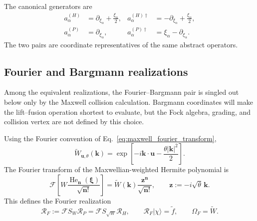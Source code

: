 \documentclass[11pt,oneside]{article}
\numberwithin{equation}{section}
\theoremstyle{definition}
\begin{document}
The canonical generators are
\begin{align}
a^{(H)}_\alpha
&=\partial_{\xi_\alpha}+\frac{\xi_\alpha}{2},
&
a^{(H)\dagger}_\alpha
&=-\partial_{\xi_\alpha}+\frac{\xi_\alpha}{2},
\label{eq:maxwell_ladder_H}
\\
a^{(P)}_\alpha
&=\partial_{\xi_\alpha},
&
a^{(P)\dagger}_\alpha
&=\xi_\alpha-\partial_{\xi_\alpha}.
\label{eq:maxwell_ladder_P}
\end{align}
The two pairs are coordinate representatives of the same abstract operators.  


\subsection{Fourier and Bargmann realizations}
\label{subsec:maxwell_fourier_bargmann}

Among the equivalent realizations, the Fourier--Bargmann pair is singled out below only by the Maxwell collision calculation.  Bargmann coordinates will make the lift--fusion operation shortest to evaluate, but the Fock algebra, grading, and collision vertex are not defined by this choice.

Using the Fourier convention of Eq.~\eqref{eq:maxwell_fourier_transform},
\begin{equation}
\widetilde W_{\bm u,\theta}(\bm k)
=\exp\!\left[-i\bm k\cdot\bm u-\frac{\theta|\bm k|^2}{2}\right].
\label{eq:maxwell_W_tilde}
\end{equation}
The Fourier transform of the Maxwellian-weighted Hermite polynomial is
\begin{equation}
\mathcal F\!\left[
W\frac{\operatorname{He}_{\bm n}(\bm\xi)}{\sqrt{\bm n!}}
\right]
=
\widetilde W(\bm k)
\frac{\bm z^{\bm n}}{\sqrt{\bm n!}},
\qquad
\bm z:=-i\sqrt\theta\,\bm k.
\label{eq:maxwell_fourier_hermite}
\end{equation}
This defines the Fourier realization
\begin{equation}
\mathcal R_F:=\mathcal F S_W \mathcal R_P
=\mathcal F S_{\sqrt W}\mathcal R_H,
\qquad
\mathcal R_F|\chi\rangle=\widetilde f,
\qquad
\Omega_F=\widetilde W.
\label{eq:maxwell_RF}
\end{equation}
\end{document}
